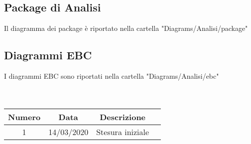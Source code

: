 \subsection{Package di Analisi}
Il diagramma dei package è riportato nella cartella "Diagrams/Analisi/package"

\subsection{Diagrammi EBC}
I diagrammi EBC sono riportati nella cartella "Diagrams/Analisi/ebc" \\

 \\ \\
\begin{tabular}{|c | c | c | c|} 
 	\hline
	 Numero & Data & Descrizione \\ [0.5ex] 
	\hline\hline
	1 & 14/03/2020 & Stesura iniziale \\ 
	\hline
\end{tabular}